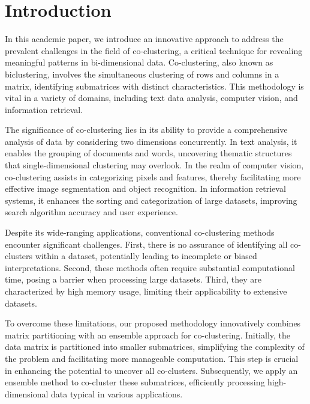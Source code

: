 
\section{Introduction}

In this academic paper, we introduce an innovative approach to address the prevalent challenges in the field of co-clustering, a critical technique for revealing meaningful patterns in bi-dimensional data. Co-clustering, also known as biclustering, involves the simultaneous clustering of rows and columns in a matrix, identifying submatrices with distinct characteristics. This methodology is vital in a variety of domains, including text data analysis, computer vision, and information retrieval.

The significance of co-clustering lies in its ability to provide a comprehensive analysis of data by considering two dimensions concurrently. In text analysis, it enables the grouping of documents and words, uncovering thematic structures that single-dimensional clustering may overlook. In the realm of computer vision, co-clustering assists in categorizing pixels and features, thereby facilitating more effective image segmentation and object recognition. In information retrieval systems, it enhances the sorting and categorization of large datasets, improving search algorithm accuracy and user experience.

Despite its wide-ranging applications, conventional co-clustering methods encounter significant challenges. First, there is no assurance of identifying all co-clusters within a dataset, potentially leading to incomplete or biased interpretations. Second, these methods often require substantial computational time, posing a barrier when processing large datasets. Third, they are characterized by high memory usage, limiting their applicability to extensive datasets.

To overcome these limitations, our proposed methodology innovatively combines matrix partitioning with an ensemble approach for co-clustering. Initially, the data matrix is partitioned into smaller submatrices, simplifying the complexity of the problem and facilitating more manageable computation. This step is crucial in enhancing the potential to uncover all co-clusters. Subsequently, we apply an ensemble method to co-cluster these submatrices, efficiently processing high-dimensional data typical in various applications.


